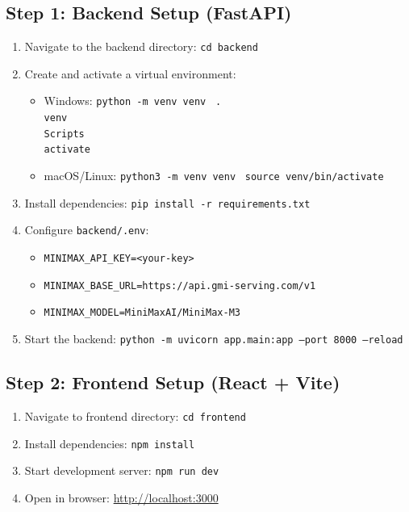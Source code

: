 ﻿\documentclass[11pt,a4paper]{article}
\begin{document}
\subsection{Step 1: Backend Setup (FastAPI)}
\begin{enumerate}[leftmargin=1.5em]
    \item Navigate to the backend directory: \texttt{cd backend}
    \item Create and activate a virtual environment:
    \begin{itemize}
        \item Windows: \texttt{python -m venv venv} \textbar\ \texttt{.\\venv\\Scripts\\activate}
        \item macOS/Linux: \texttt{python3 -m venv venv} \textbar\ \texttt{source venv/bin/activate}
    \end{itemize}
    \item Install dependencies: \texttt{pip install -r requirements.txt}
    \item Configure \texttt{backend/.env}:
    \begin{itemize}
        \item \texttt{MINIMAX\_API\_KEY=<your-key>}
        \item \texttt{MINIMAX\_BASE\_URL=https://api.gmi-serving.com/v1}
        \item \texttt{MINIMAX\_MODEL=MiniMaxAI/MiniMax-M3}
    \end{itemize}
    \item Start the backend: \texttt{python -m uvicorn app.main:app --port 8000 --reload}
\end{enumerate}

\subsection{Step 2: Frontend Setup (React + Vite)}
\begin{enumerate}[leftmargin=1.5em]
    \item Navigate to frontend directory: \texttt{cd frontend}
    \item Install dependencies: \texttt{npm install}
    \item Start development server: \texttt{npm run dev}
    \item Open in browser: \href{http://localhost:3000}{http://localhost:3000}
\end{enumerate}
\end{document}
